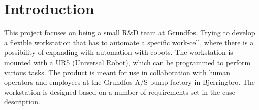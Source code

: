 \chapter{Introduction} \label{ch:introduction}

This project focuses on being a small R\&D team at Grundfos. Trying to develop a flexible workstation that has to automate a specific work-cell, where there is a possibility of expanding with automation with cobots. The workstation is mounted with a UR5 (Universal Robot), which can be programmed to perform various tasks. The product is meant for use in collaboration with human operators and employees at the Grundfos A/S pump factory in Bjerringbro. The workstation is designed based on a number of requirements set in the case description.\\


